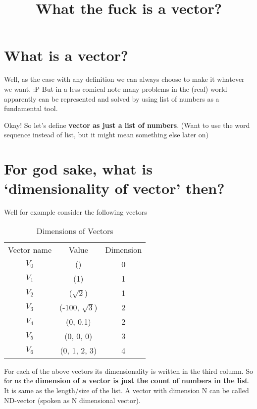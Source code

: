 \documentclass[12pt]{article}
\title{What the fuck is a vector?}
\author{}
\date{}
\begin{document}
\maketitle

\section{What is a vector?}
Well, as the case with any definition we can always choose to make it whatever we want. :P
But in a less comical note many problems in the (real) world apparently can be represented and solved by using list of numbers as a fundamental tool.

Okay! So let's define \textbf{vector as just a list of numbers}. (Want to use the word sequence instead of list, but it might mean something else later on)

\section{For god sake, what is `dimensionality of vector' then?}
Well for example consider the following vectors

\begin{table}[h]
  \centering
  \begin{tabular}{ c  c  c }
    Vector name & Value & Dimension\\
    $ V_0 $ & () & 0\\
    $ V_1 $ & (1) & 1\\
    $ V_2 $ & ($\sqrt{2}$) & 1\\
    $ V_3 $ & (-100, $\sqrt{3}$) & 2\\
    $ V_4 $ & (0, 0.1) & 2\\
    $ V_5 $ & (0, 0, 0) & 3\\
    $ V_6 $ & (0, 1, 2, 3) & 4\\
  \end{tabular}
\caption{Dimensions of Vectors}
\label{tab:dim}
\end{table}

For each of the above vectors its dimensionality is written in the third column.
So for us the \textbf{dimension of a vector is just the count of numbers in the list}.
It is same as the length/size of the list. A vector with dimension N can be called ND-vector (spoken as N dimensional vector).
\end{document}
